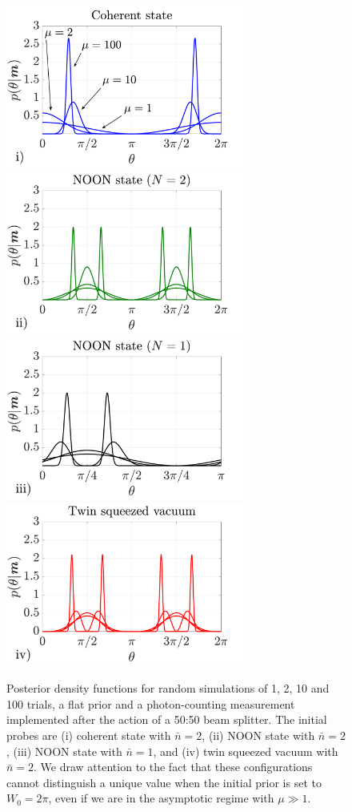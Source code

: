 \begin{figure}[t]
\centering
\includegraphics[trim={0cm 0.1cm 0cm 0cm},clip,width=7.85cm]{pictures/ch4_fig2i}\includegraphics[trim={0cm 0.1cm 0cm 0cm},clip,width=7.85cm]{pictures/ch4_fig2ii}
\includegraphics[trim={0cm 0.1cm 0cm 0cm},clip,width=7.85cm]{pictures/ch4_fig2iii}\includegraphics[trim={0cm 0.1cm 0cm 0cm},clip,width=7.85cm]{pictures/ch4_fig2iv}
	\caption[Prior information analysis of a single-parameter scheme]{Posterior density functions for random simulations of 1, 2, 10 and 100 trials, a flat prior and a photon-counting measurement implemented after the action of a 50:50 beam splitter. The initial probes are (i) coherent state with $\bar{n} = 2$, (ii) NOON state with $\bar{n} = 2$, (iii) NOON state with $\bar{n} = 1$, and (iv) twin squeezed vacuum with $\bar{n} = 2$. We draw attention to the fact that these configurations cannot distinguish a unique value  when the initial prior is set to $W_0 = 2\pi$, even if we are in the asymptotic regime with $\mu \gg 1$.}
\label{priornonasymtptotic}
\end{figure}

